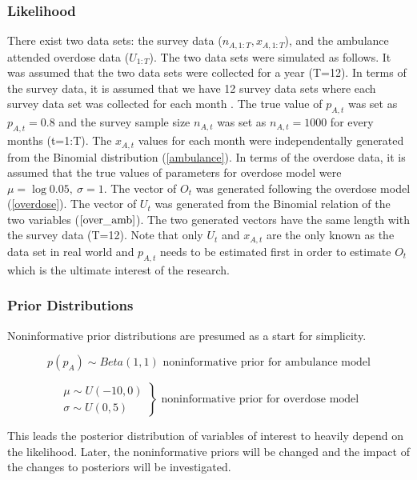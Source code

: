 \documentclass[12pt]{article}
\begin{document}
\subsubsection{Likelihood}

\normalsize 
There exist two data sets: the survey data ($n_{A,1:T}, x_{A,1:T}$), and the ambulance attended overdose data ($U_{1:T}$). The two data sets were simulated as follows. It was assumed that the two data sets were collected for a year (T=12). In terms of the survey data, it is assumed that  we have 12 survey data sets where each survey data set was collected for each month . The true value of $p_{A,t}$ was set as $p_{A,t}=0.8$ and the survey sample size $n_{A,t}$ was set as $n_{A,t}=1000$ for every months (t=1:T). The $x_{A,t}$ values for each month were independentally generated from the Binomial distribution (\ref{ambulance}).  In terms of the overdose data, it is assumed that the true values of parameters for overdose model were $\mu=\log0.05,\ \sigma=1$.
The vector of $O_t$ was generated following the overdose model (\ref{overdose}). The vector of $U_t$ was generated from the Binomial relation of the two variables ($\ref{over_amb}$). The two generated vectors have the same length with the survey data (T=12).  Note that only $U_t$ and $x_{A,t}$ are the only known as the data set in real world and $p_{A,t}$ needs to be estimated first in order to estimate $O_t$ which is the ultimate interest of the research.\\


\subsubsection{Prior Distributions}
\normalsize Noninformative prior distributions are presumed as a start for simplicity. 

\begin{equation}
\label{nonin_prior_amb}
p(p_A) \sim Beta(1,1)
\text{			noninformative prior for ambulance model}
\end{equation} 

\begin{equation}
\label{noninprior_over}
\left.\begin{aligned}
\mu \sim U(-10,0)\\
\sigma \sim U(0,5)
\end{aligned}\right\} 
\text{			noninformative prior for overdose model}
\end{equation}

This leads the posterior distribution of variables of interest to heavily depend on the likelihood. Later, the noninformative priors will be changed and the impact of the changes to posteriors will be investigated. \\
\end{document}
